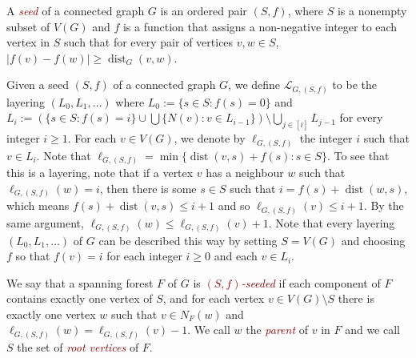 \documentclass[11pt]{article}
\newcommand{\defn}[1]{\textcolor{Maroon}{\emph{#1}}}
\renewcommand{\geq}{\geqslant}
\renewcommand{\leq}{\leqslant}
\DeclareMathOperator{\dist}{dist}
\theoremstyle{plain}
\theoremstyle{definition}
\begin{document}
		A \defn{seed} of a connected graph $G$ is an ordered pair $(S,f)$, where $S$ is a nonempty subset of $V(G)$ and $f$ is a function that assigns a non-negative integer to each vertex in $S$ such that for every pair of vertices $v,w\in S$, $|f(v)-f(w)|\geq \dist_G(v,w)$. 
		
		Given a seed $(S,f)$ of a connected graph $G$,
		we define $\mathcal{L}_{G,(S,f)}$ to be the layering $(L_0,L_1,\dots)$ where $L_0:=\{s\in S:f(s)=0\}$ and $L_i:=\left(\{s\in S:f(s)=i\}\cup \bigcup \{N(v):v\in L_{i-1}\}\right)\setminus \bigcup_{j\in [i]}L_{j-1}$ for every integer $i\geq 1$. 
		For each $v\in V(G)$, we denote by $\ell_{G,(S,f)}$ the integer $i$ such that $v\in L_i$.
		Note that $\ell_{G,(S,f)}=\min\{\dist(v,s)+f(s):s\in S\}$.
		To see that this is a layering, note that if a vertex $v$ has a neighbour $w$ such that $\ell_{G,(S,f)}(w)=i$, then there is some $s\in S$ such that $i=f(s)+\dist(w,s)$, which means $f(s)+\dist(v,s)\leq i+1$ and so $\ell_{G,(S,f)}(v)\leq i+1$.
		By the same argument, $\ell_{G,(S,f)}(w)\leq \ell_{G,(S,f)}(v)+1$.
		Note that every layering $(L_0,L_1,\dots)$ of $G$ can be described this way by setting $S=V(G)$ and choosing $f$ so that $f(v)=i$ for each integer $i\geq 0$ and each $v\in L_i$. 
		
		
		
		We say that a spanning forest $F$ of $G$ is \defn{$(S,f)$-seeded} if each component of $F$ contains exactly one vertex of $S$, and for each vertex $v\in V(G)\setminus S$ there is exactly one vertex $w$ such that $v\in N_F(w)$ and $\ell_{G,(S,f)}(w)=\ell_{G,(S,f)}(v)-1$. 
		We call $w$ the \defn{parent} of $v$ in $F$ and we call $S$ the set of \defn{root vertices} of $F$.
		
		
		
\end{document}

